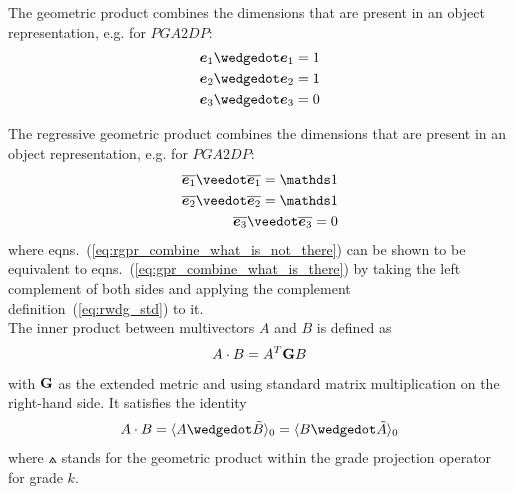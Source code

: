 The geometric product combines the dimensions that are present in an object
representation, e.g. for $PGA2DP$:
\begin{eqnarray}
    \label{eq:gpr_combine_what_is_there}
    \bv{1} \wedgedot \bv{1} = 1 \nonumber\\
    \bv{2} \wedgedot \bv{2} = 1 \\
    \bv{3} \wedgedot \bv{3} = 0 \nonumber
\end{eqnarray}

The regressive geometric product combines the dimensions that are  present
in an object
representation, e.g. for $PGA2DP$:
\begin{eqnarray}
    \label{eq:rgpr_combine_what_is_not_there}
    \rcmpl{\bv{1}} \veedot \rcmpl{\bv{1}} = \ps \nonumber\\
    \rcmpl{\bv{2}} \veedot \rcmpl{\bv{2}} = \ps \\
    \rcmpl{\bv{3}} \veedot \rcmpl{\bv{3}} = 0 \nonumber
\end{eqnarray}
where eqns.~(\ref{eq:rgpr_combine_what_is_not_there}) can be shown to be equivalent to
eqns.~(\ref{eq:gpr_combine_what_is_there}) by taking the left complement of both sides and
applying the complement definition~(\ref{eq:rwdg_std}) to it. \\

The inner product between multivectors $A$ and $B$ is defined as
\begin{equation}
    A \cdot B = A^{T} \mathbf{G} B
    \label{eg:inner_product_metric}
\end{equation}
with $\mathbf{G}$ as the extended metric and using standard matrix multiplication on the
right-hand side. It satisfies the identity
\begin{equation}
    A \cdot B  = \grprj{A \wedgedot \tilde{B}}{0} = \grprj{ B \wedgedot \tilde{A} }{0}
    \label{eq:inner_product_link_to_gpr}
\end{equation}
where $\wedgedot$ stands for the geometric product within the grade projection operator
 for grade $k$. \\
\\

